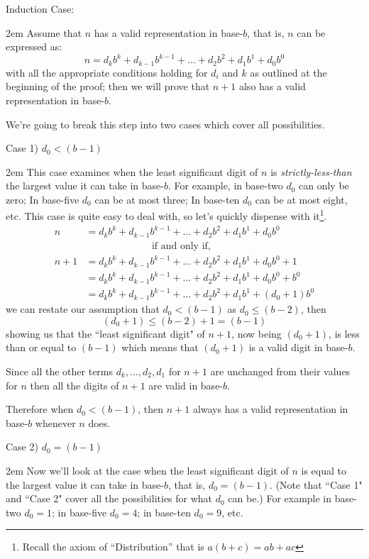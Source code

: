 \documentclass{article}
\newenvironment{jprIn}{\begin{adjustwidth}{2em}{}}{\end{adjustwidth}}
\begin{document}
Induction Case:

\begin{jprIn}
Assume that $n$ has a valid representation in base-$b$,
that is, $n$ can be expressed as: 
\[n=d_kb^k+d_{k-1}b^{k-1}+\dots+d_2b^2+d_1b^1+d_0b^0\]
with all the appropriate conditions holding for $d_i$ and $k$ as outlined at the beginning of the proof;
then we will prove that $n+1$ also has a valid representation in base-$b$.

We're going to break this step into two cases which cover all possibilities.

\break
Case 1) $d_0<(b-1)$

\begin{jprIn}
This case examines when the least significant
digit of $n$ is \emph{strictly-less-than} the largest value it can take in base-$b$.
For example, in base-two $d_0$ can only be zero;
In base-five $d_0$ can be at most three;
In base-ten $d_0$ can be at most eight, etc.
This case is
quite easy to deal with, so let's quickly dispense with it\footnote{Recall the axiom of ``Distribution'' that is $a(b+c)=ab+ac$}.
\begin{align*}
n &= d_kb^k+d_{k-1}b^{k-1}+\dots+d_2b^2+d_1b^1+d_0b^0\\
&\;\;\;\;\;\;\;\;\;\;\;\;\;\;\;\;\;\;\;\;\;\;\;\;\text{if and only if,}\\
n+1 &= d_kb^k+d_{k-1}b^{k-1}+\dots+d_2b^2+d_1b^1+d_0b^0 + 1\\
&= d_kb^k+d_{k-1}b^{k-1}+\dots+d_2b^2+d_1b^1+d_0b^0 + b^0\\
&= d_kb^k+d_{k-1}b^{k-1}+\dots+d_2b^2+d_1b^1 + (d_0+1)b^0
\end{align*}
we can restate our assumption that $d_0<(b-1)$ as $d_0\le(b-2)$, then
\[(d_0+1)\le(b-2)+1=(b-1)\]
showing us that the ``least significant digit"
of $n+1$, now being $(d_0+1)$, is less than or equal to $(b-1)$ which means that
$(d_0+1)$ is a valid digit in base-$b$.

Since all the other terms $d_k,\dots,d_2,d_1$
for $n+1$ are unchanged from their values for
$n$ then all the digits of $n+1$ are valid in base-$b$.

Therefore when $d_0<(b-1)$, then $n+1$ always has a valid representation in base-$b$ whenever $n$ does.
\end{jprIn}
\bigskip

Case 2) $d_0=(b-1)$
\begin{jprIn}
Now we'll look at the case when the least significant digit of $n$ is equal
to the largest value it can take in base-$b$, that is,
$d_0=(b-1)$.
(Note that  ``Case 1" and ``Case 2" cover all the possibilities for what $d_0$ can be.)
For example in base-two
$d_0=1$; in base-five
$d_0=4$; in base-ten $d_0=9$, etc.


\end{jprIn}
\end{jprIn}
\end{document}
